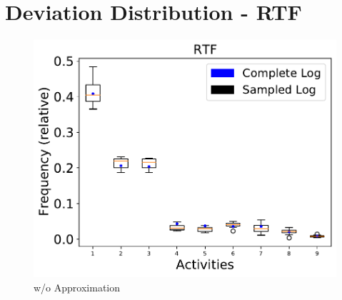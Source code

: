 \documentclass[landscape]{article}
\begin{document}
\section*{Deviation Distribution - RTF}
\begin{figure}[!htb]
	\centering
	\begin{minipage}{0.2\textwidth}
		\includegraphics[width=1.0\textwidth]{../Road_Traffic_Fines_Management_Process/Road_Traffic_Fines_Management_Process_deviations.pdf}
		\caption{w/o Approximation}
	\end{minipage}
\end{figure}
\end{document}
